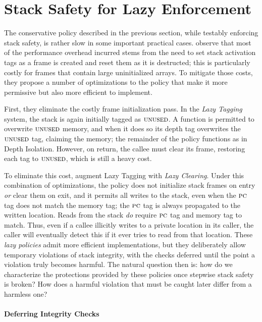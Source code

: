 \documentclass[acmsmall,review,anonymous]{acmart}\settopmatter{printfolios=true,printccs=false,printacmref=false}
\begin{document}
{\section{Stack Safety for Lazy Enforcement}
\label{sec:lazy}

The conservative policy described in the previous section, while
testably enforcing stack safety, is rather slow in
some important practical cases. \citet{DBLP:conf/sp/RoesslerD18} observe
that most of the performance overhead incurred
stems from the need to set stack activation tags as a frame is created
and reset them as it is destructed;  this
is particularly costly for frames that contain large uninitialized arrays.
To mitigate those costs, they propose a number of optimizations to the policy
that make it more permissive but also more efficient to implement.

First, they eliminate the costly frame initialization pass. In the {\em Lazy Tagging}
system, the stack is again initially tagged as \(\textsc{unused}\).
A function is permitted
to overwrite \(\textsc{unused}\) memory, and when it does so its depth tag overwrites
the \(\textsc{unused}\) tag, claiming the memory; the remainder of the policy functions
as in Depth Isolation. However, on return, the callee must clear its frame, restoring
each tag to \(\textsc{unused}\), which is still a heavy cost.

To eliminate this cost, \citet{DBLP:conf/sp/RoesslerD18} augment Lazy Tagging
with {\em Lazy Clearing}. Under this combination of optimizations,
the policy does not initialize stack frames on entry \emph{or} clear them on exit,
and it permits all writes to the stack, even when the $\textsc{pc}$ tag
does not match the memory tag; the \(\textsc{pc}\) tag is always propagated
to the written location. Reads from the stack \emph{do} require $\textsc{pc}$
tag and memory tag to match. Thus, even if a callee illicitly writes to
a private location in its caller, the caller will eventually detect this
if it ever tries to read from that location.
%
These \emph{lazy policies} admit more efficient implementations, but
they deliberately allow temporary violations of stack integrity,
with the checks deferred until the point a violation truly becomes
harmful. The natural question then is: how do we characterize the
protections provided by these policies once stepwise stack safety is broken?
How does a harmful violation that must be caught later differ from a
harmless one?

\paragraph*{Deferring Integrity Checks}

}
\end{document}

